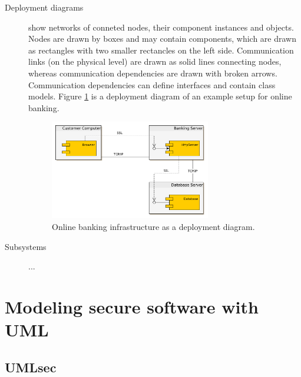 \documentclass{acmtog} %
\begin{document}
\begin{description}
	\item[Deployment diagrams] show networks of conneted nodes, their component instances and objects.
	Nodes are drawn by boxes and may contain components, which are drawn as rectangles with two smaller rectancles on the left side.
	Communication links (on the physical level) are drawn as solid lines connecting nodes, whereas communication dependencies are drawn with broken arrows.
	Communication dependencies can define interfaces and contain class models.
	Figure \ref{fig:deployment-diagram} is a deployment diagram of an example setup for online banking.
	\begin{figure}[ht]
		\centerline{\includegraphics[width=7cm]{img/uml-banking/deployment-diagram}}
		\caption{Online banking infrastructure as a deployment diagram.}
		\label{fig:deployment-diagram}
	\end{figure}

	\item[Subsystems] ...
\end{description}

\section{Modeling secure software with UML}
\label{sec:secure-software-with-uml}

\newpage
\subsection{UMLsec}
\label{sec:umlsec}
\end{document}
